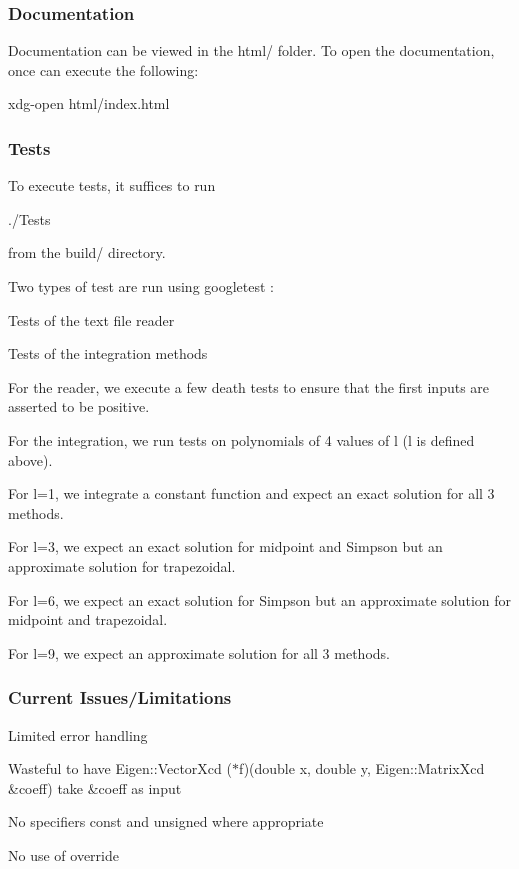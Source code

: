 \subsubsection*{Documentation}

Documentation can be viewed in the {\ttfamily html/} folder. To open the documentation, once can execute the following\+: 
\begin{DoxyCode}
xdg-open html/index.html
\end{DoxyCode}


\subsubsection*{Tests}

To execute tests, it suffices to run 
\begin{DoxyCode}
./Tests
\end{DoxyCode}
 from the {\ttfamily build/} directory.

Two types of test are run using googletest \+:
\begin{DoxyItemize}
\item Tests of the text file reader
\item Tests of the integration methods
\end{DoxyItemize}

For the reader, we execute a few death tests to ensure that the first inputs are asserted to be positive.

For the integration, we run tests on polynomials of 4 values of l (l is defined above).
\begin{DoxyItemize}
\item For l=1, we integrate a constant function and expect an exact solution for all 3 methods.
\item For l=3, we expect an exact solution for midpoint and Simpson but an approximate solution for trapezoidal.
\item For l=6, we expect an exact solution for Simpson but an approximate solution for midpoint and trapezoidal.
\item For l=9, we expect an approximate solution for all 3 methods.
\end{DoxyItemize}

\subsubsection*{Current Issues/\+Limitations}


\begin{DoxyItemize}
\item Limited error handling
\item Wasteful to have {\ttfamily Eigen\+::\+Vector\+Xcd ($\ast$f)(double x, double y, Eigen\+::\+Matrix\+Xcd \&coeff)} take {\ttfamily \&coeff} as input
\item No specifiers const and unsigned where appropriate
\item No use of override
\end{DoxyItemize}

